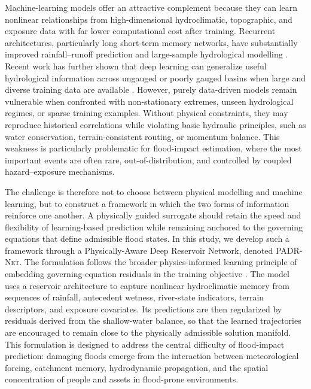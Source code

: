 \documentclass[pdflatex,sn-mathphys-ay]{sn-jnl}
\theoremstyle{thmstyleone}
\begin{document}
Machine-learning models offer an attractive complement because they can
learn nonlinear relationships from high-dimensional hydroclimatic,
topographic, and exposure data with far lower computational cost after
training.  Recurrent architectures, particularly long short-term memory
networks, have substantially improved rainfall--runoff prediction and
large-sample hydrological modelling \citep{Hochreiter1997,Kratzert2019,Kratzert2023}.
Recent work has further shown that deep learning can generalize useful
hydrological information across ungauged or poorly gauged basins when
large and diverse training data are available \citep{Nearing2024}.
However, purely data-driven models remain vulnerable when confronted
with non-stationary extremes, unseen hydrological regimes, or sparse
training examples.  Without physical constraints, they may reproduce
historical correlations while violating basic hydraulic principles,
such as water conservation, terrain-consistent routing, or momentum
balance.  This weakness is particularly problematic for flood-impact
estimation, where the most important events are often rare,
out-of-distribution, and controlled by coupled hazard--exposure
mechanisms.

The challenge is therefore not to choose between physical modelling and
machine learning, but to construct a framework in which the two forms
of information reinforce one another.  A physically guided surrogate
should retain the speed and flexibility of learning-based prediction
while remaining anchored to the governing equations that define
admissible flood states.  In this study, we develop such a framework
through a Physically-Aware Deep Reservoir Network, denoted
\textsc{PADR-Net}.  The formulation follows the broader physics-informed
learning principle of embedding governing-equation residuals in the
training objective \citep{RAISSI2019686}.  The model uses a reservoir
architecture to capture
nonlinear hydroclimatic memory from sequences of rainfall, antecedent
wetness, river-state indicators, terrain descriptors, and exposure
covariates.  Its predictions are then regularized by residuals derived
from the shallow-water balance, so that the learned trajectories are
encouraged to remain close to the physically admissible solution
manifold.  This formulation is designed to address the central
difficulty of flood-impact prediction: damaging floods emerge from the
interaction between meteorological forcing, catchment memory,
hydrodynamic propagation, and the spatial concentration of people and
assets in flood-prone environments.
\end{document}
